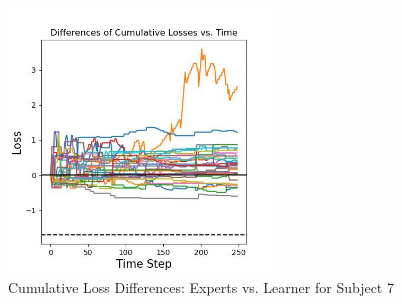 \begin{figure}[h!]
    \centering
    \includegraphics[width=0.625\textwidth]{images/RY_differences.jpg}
    \caption{Cumulative Loss Differences: Experts vs. Learner for Subject 7}
\end{figure}